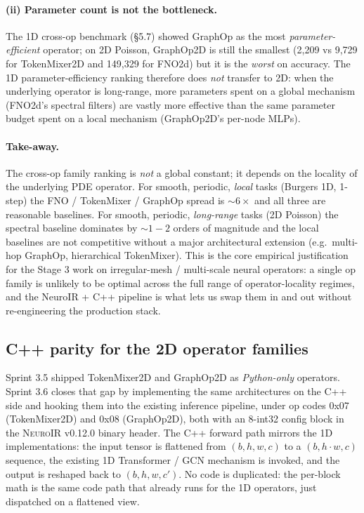 \documentclass[10pt,twocolumn]{article}
\renewcommand{\texttt}[1]{{\normalfont\ttfamily #1}\normalfont\rmfamily}
\newcommand{\neuroir}{\textsc{NeuroIR}}
\newcommand{\fno}{\textsc{FNO}}
\begin{document}
\paragraph{(ii) Parameter count is not the bottleneck.}
The 1D cross-op benchmark (§5.7) showed GraphOp as the most
\emph{parameter-efficient} operator; on 2D Poisson, GraphOp2D
is still the smallest (2{,}209 vs 9{,}729 for TokenMixer2D
and 149{,}329 for \fno{}2d) but it is the \emph{worst} on
accuracy.  The 1D parameter-efficiency ranking therefore does
\emph{not} transfer to 2D: when the underlying operator is
long-range, more parameters spent on a global mechanism
(\fno{}2d's spectral filters) are vastly more effective than
the same parameter budget spent on a local mechanism
(GraphOp2D's per-node MLPs).

\paragraph{Take-away.}
The cross-op family ranking is \emph{not} a global constant;
it depends on the locality of the underlying PDE operator.
For smooth, periodic, \emph{local} tasks (Burgers 1D, 1-step)
the FNO / TokenMixer / GraphOp spread is $\sim 6\times$ and
all three are reasonable baselines.  For smooth, periodic,
\emph{long-range} tasks (2D Poisson) the spectral baseline
dominates by $\sim 1{-}2$ orders of magnitude and the local
baselines are not competitive without a major architectural
extension (e.g.\ multi-hop GraphOp, hierarchical
TokenMixer).  This is the core empirical justification for
the Stage 3 work on irregular-mesh / multi-scale neural
operators: a single op family is unlikely to be optimal
across the full range of operator-locality regimes, and the
NeuroIR + C++ pipeline is what lets us swap them in and out
without re-engineering the production stack.

\subsection{C++ parity for the 2D operator families}
\label{sec:op-benchmark-2d-cpp}

Sprint 3.5 shipped \texttt{TokenMixer2D} and \texttt{GraphOp2D}
as \emph{Python-only} operators.  Sprint 3.6 closes that gap by
implementing the same architectures on the C++ side and
hooking them into the existing inference pipeline, under
op codes 0x07 (TokenMixer2D) and 0x08 (GraphOp2D), both
with an 8-int32 config block in the \neuroir{} v0.12.0 binary
header.  The C++ forward path mirrors the 1D
implementations: the input tensor is flattened from
$(b, h, w, c)$ to a $(b, h \cdot w, c)$ sequence, the
existing 1D Transformer / GCN mechanism is invoked, and the
output is reshaped back to $(b, h, w, c')$.  No code is
duplicated: the per-block math is the same code path that
already runs for the 1D operators, just dispatched on a
flattened view.
\end{document}
